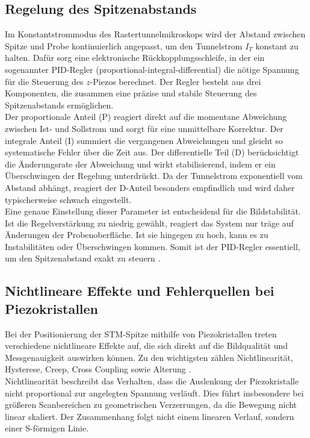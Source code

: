 \subsection{Regelung des Spitzenabstands}
\label{sec:PID-Regler}
Im Konstantstrommodus des Rastertunnelmikroskops wird der Abstand zwischen Spitze und Probe kontinuierlich angepasst, um den Tunnelstrom $I_T$ konstant zu halten. 
Dafür sorg eine elektronische Rückkopplungsschleife, in der ein sogenannter PID-Regler (proportional-integral-differential) die nötige Spannung für die Steuerung des $z$-Piezos berechnet.
Der Regler besteht aus drei Komponenten, die zusammen eine präzise und stabile Steuerung des Spitzenabstands ermöglichen.\\

Der proportionale Anteil (P) reagiert direkt auf die momentane Abweichung zwischen Ist- und Sollstrom und sorgt für eine unmittelbare Korrektur.
Der integrale Anteil (I) summiert die vergangenen Abweichungen und gleicht so systematische Fehler über die Zeit aus.
Der differentielle Teil (D) berücksichtigt die Änderungsrate der Abweichung und wirkt stabilisierend, indem er ein Überschwingen der Regelung unterdrückt. Da der Tunnelstrom exponentiell vom Abstand abhängt, reagiert der D-Anteil besonders empfindlich und wird daher typischerweise schwach eingestellt.\\ 

Eine genaue Einstellung dieser Parameter ist entscheidend für die Bildstabilität.
Ist die Regelverstärkung zu niedrig gewählt, reagiert das System nur träge auf Änderungen der Probenoberfläche. Ist sie hingegen zu hoch, kann es zu Instabilitäten oder Überschwingen kommen.
Somit ist der PID-Regler essentiell, um den Spitzenabstand exakt zu steuern \cite{naioManual}.

\subsection{Nichtlineare Effekte und Fehlerquellen bei Piezokristallen}
\label{sec:Fehlerquellen}
Bei der Positionierung der STM-Spitze mithilfe von Piezokristallen treten verschiedene nichtlineare Effekte auf, die sich direkt auf die Bildqualität und Messgenauigkeit auswirken können. Zu den wichtigsten zählen Nichtlinearität, Hysterese, Creep, Cross Coupling sowie Alterung \cite{GuidesScanningProbeMicroscope}.\\

Nichtlinearität beschreibt das Verhalten, dass die Auslenkung der Piezokristalle nicht proportional zur angelegten Spannung verläuft. Dies führt insbesondere bei größeren Scanbereichen zu geometrischen Verzerrungen, da die Bewegung nicht linear skaliert. Der Zusammenhang folgt nicht einem linearen Verlauf, sondern einer S-förmigen Linie.\\

